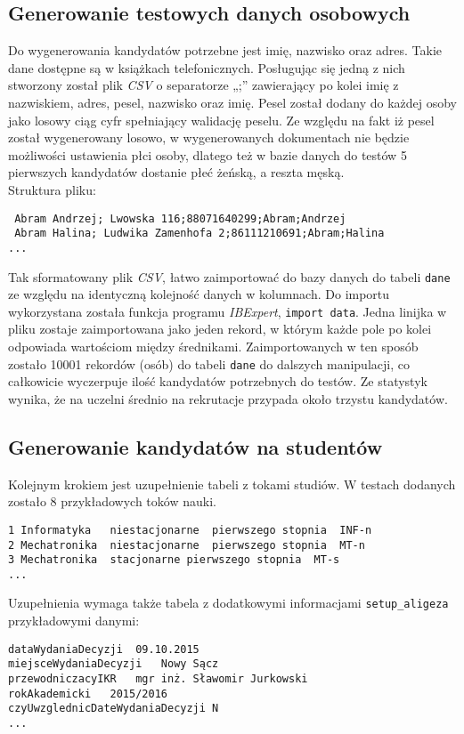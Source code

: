 \subsection{ Generowanie testowych danych osobowych}

Do wygenerowania kandydatów potrzebne jest imię, nazwisko oraz adres. Takie dane dostępne są w książkach telefonicznych. Posługując się jedną z nich stworzony został plik \emph{CSV} o separatorze „;” zawierający po kolei imię z nazwiskiem, adres, pesel, nazwisko oraz imię. Pesel został dodany do każdej osoby jako losowy ciąg cyfr spełniający walidację peselu. Ze względu na fakt iż pesel został wygenerowany losowo,  w wygenerowanych dokumentach nie będzie możliwości ustawienia płci osoby, dlatego też w bazie danych do testów 5 pierwszych kandydatów dostanie płeć żeńską, a reszta męską.\\
Struktura pliku:
\begin{lstlisting}
 Abram Andrzej; Lwowska 116;88071640299;Abram;Andrzej
 Abram Halina; Ludwika Zamenhofa 2;86111210691;Abram;Halina
...

\end{lstlisting}

Tak sformatowany plik \emph{CSV},  łatwo zaimportować do bazy danych do tabeli \texttt{dane} ze względu na identyczną kolejność danych w kolumnach. Do importu wykorzystana została funkcja programu \emph{IBExpert}, \texttt{import data}. Jedna linijka w pliku zostaje zaimportowana jako jeden rekord, w którym każde pole po kolei odpowiada wartościom między średnikami. Zaimportowanych w ten sposób zostało 10001 rekordów (osób) do tabeli \texttt{dane} do dalszych manipulacji, co całkowicie wyczerpuje ilość kandydatów potrzebnych do testów. Ze statystyk wynika, że na uczelni średnio na rekrutacje przypada około trzystu kandydatów.

\subsection{Generowanie kandydatów na studentów}

Kolejnym krokiem jest uzupełnienie tabeli z tokami studiów. W testach dodanych zostało 8 przykładowych toków nauki. 

\begin{lstlisting}
1 Informatyka	niestacjonarne	pierwszego stopnia	INF-n				
2 Mechatronika	niestacjonarne	pierwszego stopnia	MT-n				
3 Mechatronika	stacjonarne	pierwszego stopnia	MT-s				
...
\end{lstlisting}
Uzupełnienia wymaga także tabela z dodatkowymi informacjami \texttt{setup\_aligeza} przykładowymi danymi:
\begin{lstlisting}
dataWydaniaDecyzji	09.10.2015
miejsceWydaniaDecyzji	Nowy Sącz
przewodniczacyIKR	mgr inż. Sławomir Jurkowski
rokAkademicki	2015/2016
czyUwzglednicDateWydaniaDecyzji	N
...

\end{lstlisting}

